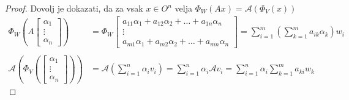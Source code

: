 \documentclass[a4paper,12pt]{article}
\begin{document}
\begin{proof}
	Dovolj je dokazati, da za vsak $x\in O^n$ velja $\Phi_W(Ax)=\mathcal{A}(\Phi_V(x))$ \\

	\begin{align*}
		\Phi_W(A\begin{bmatrix} \alpha_1 \\ \vdots \\ \alpha_n \end{bmatrix}) &= \Phi_W
			\begin{bmatrix}
				a_{11}\alpha_1 + a_{12}\alpha_2+\ldots+a_{1n}\alpha_n \\
				\vdots \\
				a_{m1}\alpha_1+a_{m2}\alpha_2+\ldots+a_{mn}\alpha_n
			\end{bmatrix}
			= \sum_{i=1}^m(\sum_{k=1}^ma_{ik}\alpha_k)w_i \\
			& \\
		\mathcal{A}(\Phi_V(\begin{bmatrix} \alpha_1 \\ \vdots \\ \alpha_n \end{bmatrix})) &= \mathcal{A}(\sum_{i=1}^n\alpha_iv_i)=\sum_{i=1}^n \alpha_i\mathcal{A}v_i=\sum_{i=1}^n\alpha_i\sum_{k=1}^ma_{ki}w_k
	\end{align*}
	
\end{proof}
\end{document}
